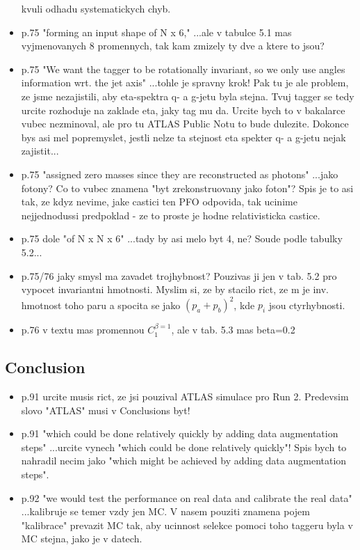 \begin{itemize}
kvuli odhadu systematickych chyb.
\item p.75 "forming an input shape of N x 6," ...ale v tabulce 5.1 mas 
vyjmenovanych 8 promennych, tak kam zmizely ty dve a ktere to jsou?
\item p.75 "We want the tagger to be rotationally invariant, so we only use 
angles information wrt. the jet axis" ...tohle je spravny krok! Pak tu 
je ale problem, ze jsme nezajistili, aby eta-spektra q- a g-jetu byla 
stejna. Tvuj tagger se tedy urcite rozhoduje na zaklade eta, jaky tag mu 
da. Urcite bych to v bakalarce vubec nezminoval, ale pro tu ATLAS Public 
Notu to bude dulezite. Dokonce bys asi mel popremyslet, jestli nelze ta 
stejnost eta spekter q- a g-jetu nejak zajistit...
\item p.75 "assigned zero masses since they are reconstructed as photons" 
...jako fotony? Co to vubec znamena "byt zrekonstruovany jako foton"? 
Spis je to asi tak, ze kdyz nevime, jake castici ten PFO odpovida, tak 
ucinime nejjednodussi predpoklad - ze to proste je hodne relativisticka 
castice.
\item p.75 dole "of N x N x 6" ...tady by asi melo byt 4, ne? Soude podle 
tabulky 5.2...
\item p.75/76 jaky smysl ma zavadet trojhybnost? Pouzivas ji jen v tab. 5.2 
pro vypocet invariantni hmotnosti. Myslim si, ze by stacilo rict, ze m 
je inv. hmotnost toho paru a spocita se jako $(p_a + p_b)^2$, kde $p_i$ jsou 
ctyrhybnosti.
\item p.76 v textu mas promennou $C_1^{\beta=1}$, ale v tab. 5.3 mas beta=0.2
\end{itemize}

\subsection{Conclusion}
\begin{itemize} 
\item p.91 urcite musis rict, ze jsi pouzival ATLAS simulace pro Run 2. 
Predevsim slovo "ATLAS" musi v Conclusions byt! 
\item p.91 "which could be done relatively quickly by adding data 
augmentation steps" ...urcite vynech "which could be done relatively 
quickly"! Spis bych to nahradil necim jako "which might be achieved by 
adding data augmentation steps".
\item p.92 "we would test the performance on real data and calibrate the 
real data" ...kalibruje se temer vzdy jen MC. V nasem pouziti znamena 
pojem "kalibrace" prevazit MC tak, aby ucinnost selekce pomoci toho 
taggeru byla v MC stejna, jako je v datech.
\end{itemize}





